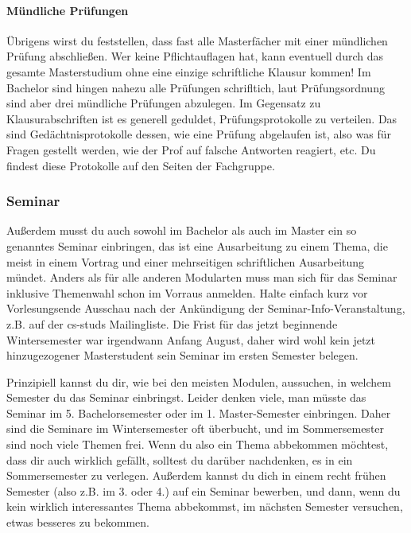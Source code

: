 \begin{multicols}{2}
\paragraph*{Mündliche Prüfungen}
Übrigens wirst du feststellen, dass fast alle Masterfächer mit einer
 mündlichen Prüfung abschließen. 
 Wer keine Pflichtauflagen hat, kann eventuell durch das gesamte
 Masterstudium ohne eine einzige schriftliche Klausur kommen! 
Im Bachelor sind hingen nahezu alle Prüfungen schrifltich, laut
 Prüfungsordnung sind aber drei mündliche Prüfungen abzulegen.
Im Gegensatz zu Klausurabschriften ist es generell geduldet, Prüfungsprotokolle zu verteilen. Das sind Gedächtnisprotokolle dessen, wie eine Prüfung abgelaufen ist, also was für Fragen gestellt werden, wie der Prof auf falsche Antworten reagiert, etc. Du findest diese Protokolle auf den Seiten der Fachgruppe.

\subsubsection{Seminar}
Außerdem musst du auch sowohl im Bachelor als auch im Master ein so genanntes Seminar einbringen, das ist eine Ausarbeitung zu einem Thema, die meist in einem Vortrag und einer mehrseitigen schriftlichen Ausarbeitung mündet. Anders als für alle anderen Modularten muss man sich für das Seminar inklusive Themenwahl schon im Vorraus anmelden. Halte einfach kurz vor Vorlesungsende Ausschau nach der Ankündigung der Seminar-Info-Veranstaltung, z.B. auf der cs-studs Mailingliste. Die Frist für das jetzt beginnende Wintersemester war irgendwann Anfang August, daher wird wohl kein jetzt hinzugezogener Masterstudent sein Seminar im ersten Semester belegen.

Prinzipiell kannst du dir, wie bei den meisten Modulen, aussuchen, in welchem Semester du das Seminar einbringst. Leider denken viele, man müsste das Seminar im 5. Bachelorsemester oder im 1. Master-Semester einbringen. Daher sind die Seminare im Wintersemester oft überbucht, und im Sommersemester sind noch viele Themen frei. Wenn du also ein Thema abbekommen möchtest, dass dir auch wirklich gefällt, solltest du darüber nachdenken, es in ein Sommersemester zu verlegen. Außerdem kannst du dich in einem recht frühen Semester (also z.B. im 3. oder 4.) auf ein Seminar bewerben, und dann, wenn du kein wirklich interessantes Thema abbekommst, im nächsten Semester versuchen, etwas besseres zu bekommen.


\end{multicols}
